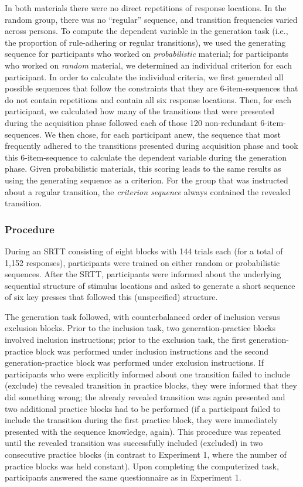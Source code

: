 \documentclass[man]{apa6}
\theoremstyle{definition}
\theoremstyle{definition}
\theoremstyle{definition}
\theoremstyle{remark}
\begin{document}
In both materials there were no direct repetitions of response
locations. In the random group, there was no \enquote{regular} sequence,
and transition frequencies varied across persons. To compute the
dependent variable in the generation task (i.e., the proportion of
rule-adhering or regular transitions), we used the generating sequence
for participants who worked on \emph{probabilistic} material; for
participants who worked on \emph{random} material, we determined an
individual criterion for each participant. In order to calculate the
individual criteria, we first generated all possible sequences that
follow the constraints that they are 6-item-sequences that do not
contain repetitions and contain all six response locations. Then, for
each participant, we calculated how many of the transitions that were
presented during the acquisition phase followed each of those 120
non-redundant 6-item-sequences. We then chose, for each participant
anew, the sequence that most frequently adhered to the transitions
presented during acquisition phase and took this 6-item-sequence to
calculate the dependent variable during the generation phase. Given
probabilistic materials, this scoring leads to the same results as using
the generating sequence as a criterion. For the group that was
instructed about a regular transition, the \emph{criterion sequence}
always contained the revealed transition.

\subsubsection{Procedure}\label{procedure-1}

During an SRTT consisting of eight blocks with 144 trials each (for a
total of 1,152 responses), participants were trained on either random or
probabilistic sequences. After the SRTT, participants were informed
about the underlying sequential structure of stimulus locations and
asked to generate a short sequence of six key presses that followed this
(unspecified) structure.

The generation task followed, with counterbalanced order of inclusion
versus exclusion blocks. Prior to the inclusion task, two
generation-practice blocks involved inclusion instructions; prior to the
exclusion task, the first generation-practice block was performed under
inclusion instructions and the second generation-practice block was
performed under exclusion instructions. If participants who were
explicitly informed about one transition failed to include (exclude) the
revealed transition in practice blocks, they were informed that they did
something wrong; the already revealed transition was again presented and
two additional practice blocks had to be performed (if a participant
failed to include the transition during the first practice block, they
were immediately presented with the sequence knowledge, again). This
procedure was repeated until the revealed transition was successfully
included (excluded) in two consecutive practice blocks (in contrast to
Experiment 1, where the number of practice blocks was held constant).
Upon completing the computerized task, participants answered the same
questionnaire as in Experiment 1.
\end{document}
